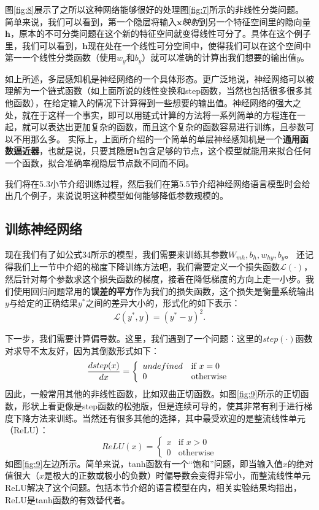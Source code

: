 \documentclass[10pt,a4paper]{ctexart}
\begin{document}
图\ref{fig:8}展示了之所以这种网络能够很好的处理图\ref{fig:7}所示的非线性分类问题。
简单来说，我们可以看到，第一个隐层将输入$\textbf{x}$\textit{映射}到另一个特征空间里的隐向量$\textbf{h}$，原本的不可分类问题在这个新的特征空间就变得线性可分了。具体在这个例子里，我们可以看到，$\textbf{h}$现在处在一个线性可分空间中，使得我们可以在这个空间中第一一个线性分类函数（使用$w_y$和$b_y$）就可以准确的计算出我们想要的输出值$y$。

如上所述，多层感知机是神经网络的一个具体形态。更广泛地说，神经网络可以被理解为一个链式函数（如上面所说的线性变换和step函数，当然也包括很多很多其他函数），在给定输入的情况下计算得到一些想要的输出值。神经网络的强大之处，就在于这样一个事实，即可以用链式计算的方法将一系列简单的方程连在一起，就可以表达出更加复杂的函数，而且这个复杂的函数容易进行训练，且参数可以不用那么多。
实际上，上面所介绍的一个简单的单层神经感知机是一个\textbf{通用函数逼近器}\cite{hornik1989multilayer}，也就是说，只要其隐层$\textbf{h}$包含足够的节点，这个模型就能用来拟合任何一个函数，拟合准确率视隐层节点数不同而不同。

我们将在5.3小节介绍训练过程，然后我们在第5.5节介绍神经网络语言模型时会给出几个例子，来说说明这种模型如何能够降低参数规模的。
\subsection{训练神经网络}
现在我们有了如公式34所示的模型，我们需要来训练其参数$W_{mh},b_{h},w_{hy},b_y$。
还记得我们上一节中介绍的梯度下降训练方法吧，我们需要定义一个损失函数$\mathcal{L}(\cdot)$，然后针对每个参数求这个损失函数的梯度，接着在降低梯度的方向上走一小步。我们使用回归问题常用的\textbf{误差的平方}作为我们的损失函数，这个损失是衡量系统输出$y$与给定的正确结果$y^*$之间的差异大小的，形式化的如下表示：
\[
 \mathcal{L}(y^*,y) = (y^* - y)^2.
\]

下一步，我们需要计算偏导数。这里，我们遇到了一个问题：这里的$step(\cdot)$函数对求导不太友好，因为其倒数形式如下：
\[
 \frac{\mathnormal{d}step(x)}{\mathnormal{d}x} = \left\{ \begin{array}{ll}
  undefined & \textrm{if $x = 0$} \\
  0 & \textrm{otherwise}
  \end{array} \right.
\]
因此，一般常用其他的非线性函数，比如双曲正切函数。如图\ref{fig:9}所示的正切函数，形状上看更像是step函数的松弛版，但是连续可导的，使其非常有利于进行梯度下降方法来训练。当然还有很多其他的选择，其中最受欢迎的是整流线性单元（ReLU）：
\[
 ReLU(x) = \left\{ \begin{array}{ll}
  x & \textrm{if $x > 0$} \\
  0 & \textrm{otherwise}
  \end{array} \right.
\]
如图\ref{fig:9}左边所示。简单来说，tanh函数有一个“饱和”问题，即当输入值$x$的绝对值很大（$x$是极大的正数或极小的负数）时偏导数会变得非常小，而整流线性单元ReLU解决了这个问题。包括本节介绍的语言模型在内，相关实验结果均指出，ReLU是tanh函数的有效替代者\cite{vaswani2013decoding}。
\end{document}
